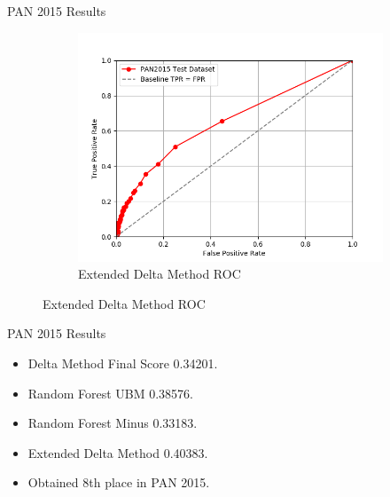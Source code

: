 \documentclass[10pt]{beamer}
\begin{document}
\begin{frame}[fragile]{PAN 2015 Results}
\begin{figure}
\begin{subfigure}{.4\textwidth}
            \includegraphics[width=\textwidth]{../../report/pictures/extended_delta_method_roc.png}
            \caption{Extended Delta Method ROC}
        \end{subfigure}
    \end{figure}
\end{frame}

\begin{frame}[fragile]{PAN 2015 Results}

    \begin{itemize}
        \item Delta Method Final Score 0.34201.
        \item Random Forest UBM 0.38576.
        \item Random Forest Minus 0.33183.
        \item Extended Delta Method 0.40383.
        \item Obtained 8th place in PAN 2015.
    \end{itemize}

\end{frame}
\end{document}
